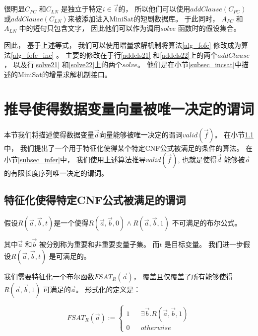 很明显$C_{PC}$ 和$C_{LN}$ 是独立于特定$i\in \vec{i}$的，
所以他们可以使用$addClause(C_{PC})$ 或$addClause(C_{LN})$来被添加进入MiniSat的短剧数据库。
于此同时，
$A_{PC}$ 和$A_{LN}$ 中的短句只包含文字，
因此他们可以作为调用$solve$ 函数时的假设集合。

因此，
基于上述等式，
我们可以使用增量求解机制将算法\ref{alg_fofc} 修改成为算法\ref{alg_fofc_inc} 。
主要的修改在于行\ref{addcls21} 和\ref{addcls22}上的两个$addClause$ ，
以及行\ref{solve21} 和\ref{solve22}上的两个$solve$。
他们是在小节\ref{subsec_incsat}中描述的MiniSat的增量求解机制接口。




\section{推导使得数据变量向量被唯一决定的谓词}\label{sec_infer}

本节我们将描述使得数据变量$\vec{d}$向量能够被唯一决定的谓词$valid(\vec{f})$。
在小节\ref{subsec_craig}中，
我们提出了一个用于特征化使得某个特定CNF公式被满足的条件的算法。
在小节\ref{subsec_infer}中，
我们使用上述算法推导$valid(\vec{f})$,
也就是使得$\vec{d}$ 能够被$\vec{o}$的有限长度序列唯一决定的谓词。


\subsection{特征化使得特定CNF公式被满足的谓词}\label{subsec_craig}

假设$R(\vec{a},\vec{b},t)$是一个使得$R(\vec{a},\vec{b},0)\wedge R(\vec{a},\vec{b},1)$ 不可满足的布尔公式。

其中$\vec{a}$ 和$\vec{b}$ 被分别称为重要和非重要变量子集。
而$t$ 是目标变量。
我们进一步假设$R(\vec{a},\vec{b},t)$ 是可满足的。

我们需要特征化一个布尔函数$FSAT_R(\vec{a})$，
覆盖且仅覆盖了所有能够使得$R(\vec{a},\vec{b},1)$ 可满足的$\vec{a}$。
形式化的定义是：

\begin{equation}\label{fchar}
FSAT_R(\vec{a}):=
\left\{
\begin{array}{rcl}
1 & & \exists\vec{b}.R(\vec{a},\vec{b},1) \\
0 & & otherwise
\end{array}
\right.
\end{equation}

